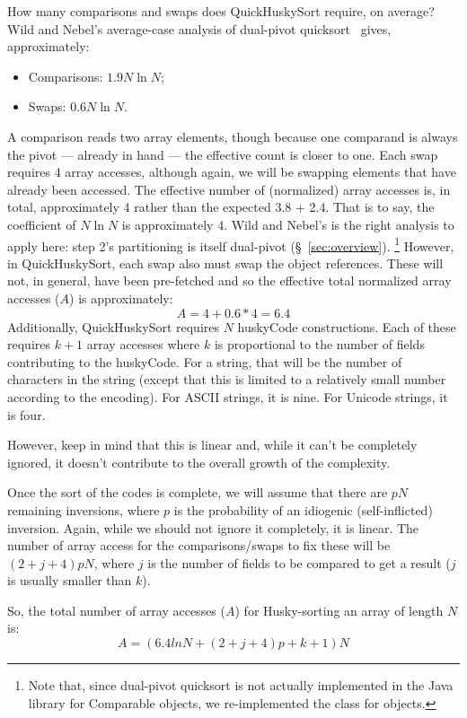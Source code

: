 \documentclass[twoside,leqno,twocolumn]{article}
\begin{document}
How many comparisons and swaps does QuickHuskySort require, on average?
Wild and Nebel's average-case analysis of dual-pivot quicksort~\cite{WildNebel12} gives, approximately:
\begin{itemize}
    \item Comparisons: $1.9 N \ln N$;
    \item Swaps: $0.6 N \ln N$.
\end{itemize}

A comparison reads two array elements, though because one comparand is always the pivot --- already
in hand --- the effective count is closer to one.
Each swap requires 4 array accesses, although again, we will be swapping elements that have already been accessed.
The effective number of (normalized) array accesses is, in total, approximately 4 rather than the expected 3.8 + 2.4.
That is to say, the coefficient of $N \ln N$ is approximately 4.
Wild and Nebel's is the right analysis to apply here: step 2's partitioning is itself dual-pivot
(\S~\ref{sec:overview}).
\footnote{Note that, since dual-pivot quicksort is not actually implemented in the Java library for Comparable objects,
    we re-implemented the class for objects.}
However, in QuickHuskySort, each swap also must swap the object references.
These will not, in general, have been pre-fetched and so the effective total normalized array accesses ($A$) is approximately:
\[A = 4 + 0.6 * 4 = 6.4\]
Additionally, QuickHuskySort requires $N$ huskyCode constructions.
Each of these requires $k+1$ array accesses where $k$ is proportional to the number of fields contributing to the huskyCode.
For a string,
that will be the number of characters in the string (except that this is limited to a relatively small number according to the encoding).
For ASCII strings, it is nine.
For Unicode strings, it is four.

However, keep in mind that this is linear and, while it can’t be completely ignored,
it doesn't contribute to the overall growth of the complexity.

Once the sort of the codes is complete, we will assume that there are $p N$ remaining inversions,
where $p$ is the probability of an idiogenic (self-inflicted) inversion.
Again, while we should not ignore it completely, it is linear.
The number of array access for the comparisons/swaps to fix these will be $(2 + j + 4) p N$,
where $j$ is the number of fields to be compared to get a result ($j$ is usually smaller than $k$).

So, the total number of array accesses ($A$) for Husky-sorting an array of length $N$ is:
\[A = (6.4 ln N + (2 + j + 4) p + k + 1) N\]
   
\end{document}
